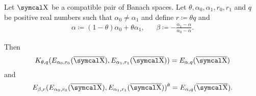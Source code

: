 \begin{theorem}\label{thm:interpolation_space_and_approximation_space}
  Let \( \CX \) be a compatible pair of Banach spaces. Let \( \theta, \alpha_0, \alpha_1, r_0, r_1 \) and \( q \) be positive real numbers such that \( \alpha_0 \neq \alpha_1 \) and define \( r \coloneqq \theta q \) and
  \begin{align*}
    \alpha \coloneqq (1 - \theta) \alpha_0 + \theta \alpha_1,
    &&
    \beta \coloneqq - \frac {\alpha_1 - \alpha} {\alpha_0 - \alpha}.
  \end{align*}

  Then
  \begin{equation*}
    K_{\theta,q}(E_{\alpha_0,r_0}(\Ol{\CX}), E_{\alpha_1,r_1}(\Ol{\CX})) = E_{\alpha,q}(\Ol{\CX})
  \end{equation*}
  and
  \begin{equation*}
    E_{\beta,r}(E_{\alpha_0,r_0}(\Ol{\CX}), E_{\alpha_1,r_1}(\Ol{\CX}))^\theta = E_{\alpha,q}(\Ol{\CX}).
  \end{equation*}
\end{theorem}
